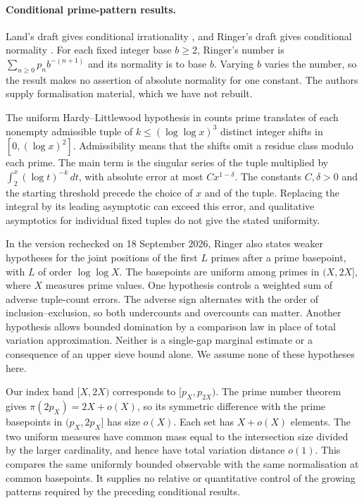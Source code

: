 \paragraph{Conditional prime-pattern results.}
Land's draft gives conditional irrationality
\cite[Conjecture~1, Theorem~2]{land2026}, and Ringer's draft gives
conditional normality \cite{ringer2026}.  For each fixed integer base
$b\ge2$, Ringer's number is $\sum_{n\ge0}p_nb^{-(n+1)}$ and its
normality is to base $b$.  Varying $b$ varies the number, so the result
makes no assertion of absolute normality for one constant.
The authors supply formalisation material, which we have not rebuilt.

The uniform Hardy--Littlewood hypothesis in
\cite[Conjecture~1.3]{kuperberg2023} counts prime translates of each
nonempty admissible tuple of $k\le(\log\log x)^3$ distinct integer
shifts in $[0,(\log x)^2]$.  Admissibility means that the shifts omit a
residue class modulo each prime.  The main term is the singular series
of the tuple multiplied by $\int_2^x(\log t)^{-k}\,dt$, with absolute
error at most $Cx^{1-\delta}$.  The constants $C,\delta>0$ and the
starting threshold precede the choice of $x$ and of the tuple.
Replacing the integral by its leading asymptotic can exceed this error,
and qualitative asymptotics for individual fixed tuples do not give
the stated uniformity.

In the version rechecked on 18 September 2026, Ringer also states weaker
hypotheses for the joint positions of the first $L$ primes after a prime
basepoint, with $L$ of order $\log\log X$.  The basepoints are uniform
among primes in $(X,2X]$, where $X$ measures prime values.
One hypothesis controls a weighted sum of adverse tuple-count errors.
The adverse sign alternates with the order of inclusion--exclusion,
so both undercounts and overcounts can matter.  Another hypothesis
allows bounded domination by a comparison law in place of total variation
approximation.  Neither is a single-gap marginal estimate or a consequence
of an upper sieve bound alone.  We assume none of these hypotheses here.

Our index band $[X,2X)$ corresponds to $[p_X,p_{2X})$.  The prime number
theorem gives $\pi(2p_X)=2X+o(X)$, so its symmetric difference with the
prime basepoints in $(p_X,2p_X]$ has size $o(X)$.  Each set has
$X+o(X)$ elements.  The two uniform measures have common mass equal to
the intersection size divided by the larger cardinality, and hence
have total variation distance $o(1)$.  This compares the same uniformly
bounded observable with the same normalisation at common basepoints.
It supplies no relative or quantitative control of the growing patterns
required by the preceding conditional results.

